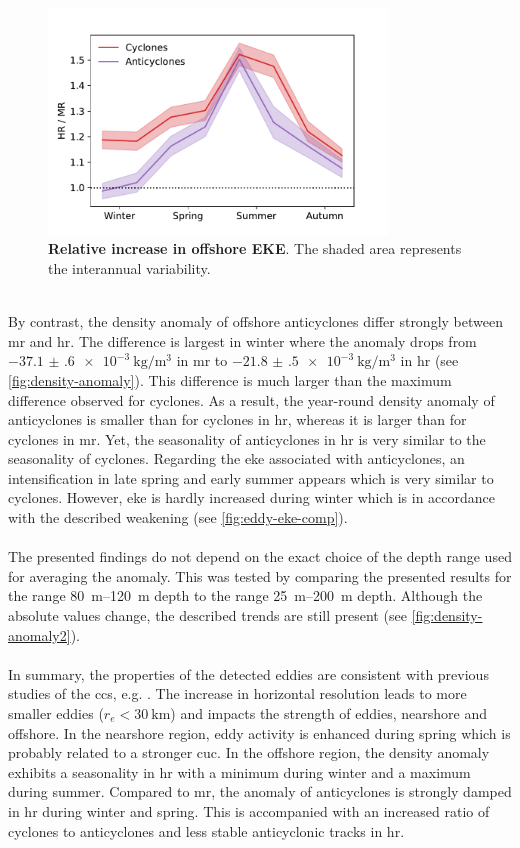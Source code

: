 \begin{figure}
    \centering
    \includegraphics[width=9cm, trim=0 0 0 0]{../figures/result_eddies_eke_comparison}
    \caption[Relative increase in offshore EKE]{\textbf{Relative increase in offshore EKE}. The shaded area represents the interannual variability.}\label{fig:eddy-eke-comp}
\end{figure}
\\
By contrast, the density anomaly of offshore anticyclones differ strongly between \ac{mr} and \ac{hr}. The difference is largest in winter where the anomaly drops from $\SI{-37.1(6)e-3}{\kilo\gram\per\metre\cubed}$ in \ac{mr} to $\SI{-21.8(5)e-3}{\kilo\gram\per\metre\cubed}$ in \ac{hr} (see \autoref{fig:density-anomaly}). This difference is much larger than the maximum difference observed for cyclones. As a result, the year-round density anomaly of anticyclones is smaller than for cyclones in \ac{hr}, whereas it is larger than for cyclones in \ac{mr}. Yet, the seasonality of anticyclones in \ac{hr} is very similar to the seasonality of cyclones. Regarding the \ac{eke} associated with anticyclones, an intensification in late spring and early summer appears which is very similar to cyclones. However, \ac{eke} is hardly increased during winter which is in accordance with the described weakening (see \autoref{fig:eddy-eke-comp}).\\
\\
The presented findings do not depend on the exact choice of the depth range used for averaging the anomaly. This was tested by comparing the presented results for the range \SIrange{80}{120}{\metre} depth to the range \SIrange{25}{200}{\metre} depth. Although the absolute values change, the described trends are still present (see \autoref{fig:density-anomaly2}).\\
\\
In summary, the properties of the detected eddies are consistent with previous studies of the \ac{ccs}, e.g. \textcite{kurian-2011-eddy-props}. The increase in horizontal resolution leads to more smaller eddies ($r_e < \SI{30}{\kilo\metre}$) and impacts the strength of eddies, nearshore and offshore. In the nearshore region, eddy activity is enhanced during spring which is probably related to a stronger \ac{cuc}. In the offshore region, the density anomaly exhibits a seasonality in \ac{hr} with a minimum during winter and a maximum during summer. Compared to \ac{mr}, the anomaly of anticyclones is strongly damped in \ac{hr} during winter and spring. This is accompanied with an increased ratio of cyclones to anticyclones and less stable anticyclonic tracks in \ac{hr}.